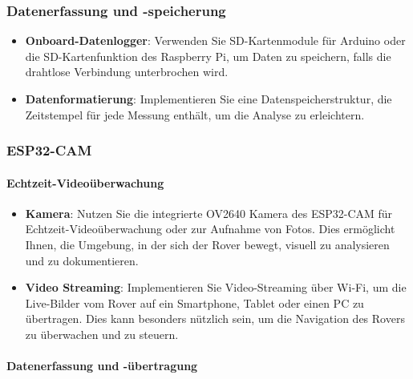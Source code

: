 \documentclass{vorlage-design-main}
\begin{document}
\hypertarget{datenerfassung-und--speicherung}{%
\subsubsection{Datenerfassung und
-speicherung}\label{datenerfassung-und--speicherung}}

\begin{itemize}

\item
  \textbf{Onboard-Datenlogger}: Verwenden Sie SD-Kartenmodule für
  Arduino oder die SD-Kartenfunktion des Raspberry Pi, um Daten zu
  speichern, falls die drahtlose Verbindung unterbrochen wird.
\item
  \textbf{Datenformatierung}: Implementieren Sie eine
  Datenspeicherstruktur, die Zeitstempel für jede Messung enthält, um
  die Analyse zu erleichtern.
\end{itemize}

\hypertarget{esp32-cam}{%
\subsubsection{ESP32-CAM}\label{esp32-cam}}

\hypertarget{echtzeit-videouxfcberwachung}{%
\paragraph{Echtzeit-Videoüberwachung}\label{echtzeit-videoueberwachung}}

\begin{itemize}

\item
  \textbf{Kamera}: Nutzen Sie die integrierte OV2640 Kamera des
  ESP32-CAM für Echtzeit-Videoüberwachung oder zur Aufnahme von Fotos.
  Dies ermöglicht Ihnen, die Umgebung, in der sich der Rover bewegt,
  visuell zu analysieren und zu dokumentieren.
\item
  \textbf{Video Streaming}: Implementieren Sie Video-Streaming über
  Wi-Fi, um die Live-Bilder vom Rover auf ein Smartphone, Tablet oder
  einen PC zu übertragen. Dies kann besonders nützlich sein, um die
  Navigation des Rovers zu überwachen und zu steuern.
\end{itemize}

\hypertarget{datenerfassung-und--uxfcbertragung}{%
\paragraph{Datenerfassung und
-übertragung}\label{datenerfassung-und--uebertragung}}
\end{document}
